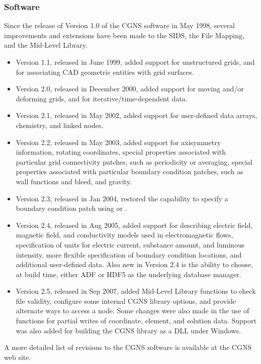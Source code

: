 \subsubsection{Software}

Since the release of Version 1.0 of the CGNS software in May 1998,
several improvements and extensions have been made to the SIDS, the File
Mapping, and the Mid-Level Library.

\begin{itemize}
\item Version 1.1, released in June 1999, added support for
      unstructured grids, and for associating CAD geometric entities
      with grid surfaces.
\item Version 2.0, released in December 2000, added support for
      moving and/or deforming grids, and for iterative/time-dependent
      data.
\item Version 2.1, released in May 2002, added support for
      user-defined data arrays, chemistry, and linked nodes.
\item Version 2.2, released in May 2003, added support for axisymmetry
      information, rotating coordinates, special properties associated
      with particular grid connectivity patches, such as periodicity or
      averaging, special properties associated with particular boundary
      condition patches, such as wall functions and bleed, and gravity.
\item Version 2.3, released in Jan 2004, restored the capability to
      specify a boundary condition patch using  or
      .
\item Version 2.4, released in Aug 2005, added support for describing
      electric field, magnetic field, and conductivity models used
      in electromagnetic flows, specification of units for electric
      current, substance amount, and luminous intensity, more flexible
      specification of boundary condition locations, and additional
      user-defined data.
      Also new in Version 2.4 is the ability to choose, at build time,
      either ADF or HDF5 as the underlying database manager.
\item Version 2.5, released in Sep 2007, added Mid-Level Library
      functions to check file validity, configure some internal CGNS
      library options, and provide alternate ways to access a node.
      Some changes were also made in the use of functions for partial
      writes of coordinate, element, and solution data.
      Support was also added for building the CGNS library as a DLL under
      Windows.
\end{itemize}
A more detailed list of revisions to the CGNS software is available at
the CGNS web site.

